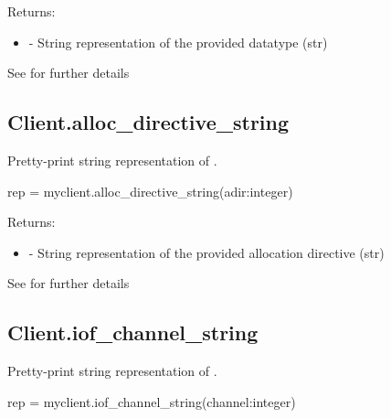 \begin{arglist}
\end{arglist}

Returns:
\begin{itemize}
    \item {} - String representation of the provided datatype (str)
\end{itemize}

See  for further details


\subsection{Client.alloc_directive_string}

\summary

Pretty-print string representation of .

\format

\pyspecificstart
\begin{codepar}
rep = myclient.alloc_directive_string(adir:integer)
\end{codepar}
\pyspecificend

\begin{arglist}
\end{arglist}

Returns:
\begin{itemize}
    \item {} - String representation of the provided allocation directive (str)
\end{itemize}

See  for further details


\subsection{Client.iof_channel_string}

\summary

Pretty-print string representation of .

\format

\pyspecificstart
\begin{codepar}
rep = myclient.iof_channel_string(channel:integer)
\end{codepar}
\pyspecificend

